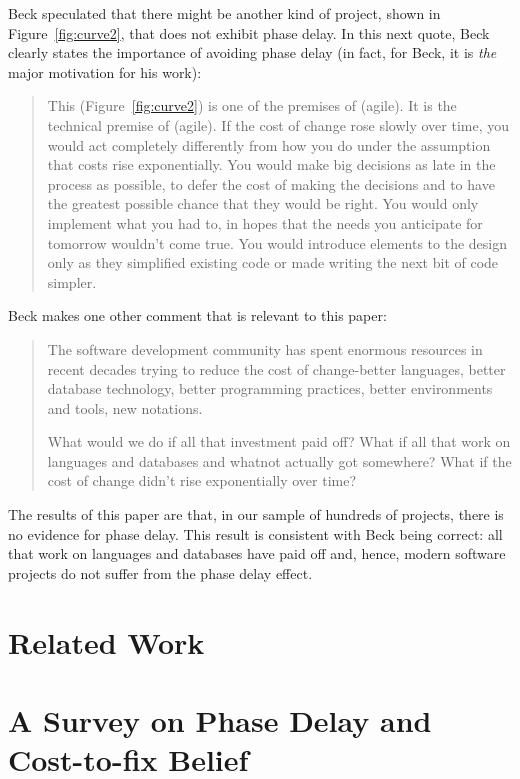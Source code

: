 \documentclass{sig-alternate}
\newcommand{\fig}[1]{Figure~\ref{fig:#1}}
\begin{document}
Beck speculated that there might be another kind of project, shown in \fig{curve2},
that does not exhibit phase delay. In this next quote, Beck clearly states
the importance of avoiding phase delay (in fact, for Beck, it is {\em the} major
motivation for his work):
\begin{quote}
This (\fig{curve2}) is one of the premises of (agile). It is the technical premise of (agile). If the cost of change rose slowly over time, you would act completely differently from how you do under the assumption that costs rise exponentially. You would make big decisions as late in the process as possible, to defer the cost of making the decisions and to have the greatest possible chance that they would be right. You would only implement what you had to, in hopes that the needs you anticipate for tomorrow wouldn't come true. You would introduce elements to the design only as they simplified existing code or made writing the next bit of code simpler.~\cite{beck00}
\end{quote}
Beck makes one other comment that is relevant to this paper: 
\begin{quote}
The software development community has spent enormous resources in recent decades trying to reduce the cost of change-better languages, better database technology, better programming practices, better environments and tools, new notations.

What would we do if all that investment paid off? What if all that work on languages and databases and whatnot actually got somewhere? What if the cost of change didn't rise exponentially over time?~\cite{beck00}
\end{quote}
The results of this paper are that, in our sample of hundreds of projects, there is no evidence for phase delay.
This result is   consistent with Beck being correct: all that work on    languages and databases
have paid off and, hence, modern software projects do not suffer from the  phase delay effect.  


\section{Related Work}
 



\section{A Survey on Phase Delay and Cost-to-fix Belief}
\label{survey}
\end{document}
